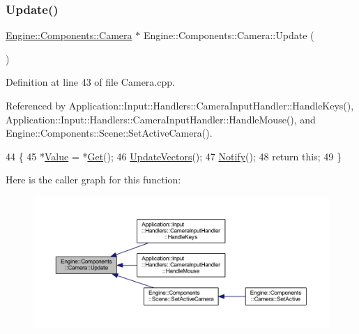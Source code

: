\subsubsection{\texorpdfstring{Update()}{Update()}}
{\footnotesize\ttfamily \mbox{\hyperlink{classEngine_1_1Components_1_1Camera}{Engine\+::\+Components\+::\+Camera}} $\ast$ Engine\+::\+Components\+::\+Camera\+::\+Update (\begin{DoxyParamCaption}{ }\end{DoxyParamCaption})}



Definition at line 43 of file Camera.\+cpp.



Referenced by Application\+::\+Input\+::\+Handlers\+::\+Camera\+Input\+Handler\+::\+Handle\+Keys(), Application\+::\+Input\+::\+Handlers\+::\+Camera\+Input\+Handler\+::\+Handle\+Mouse(), and Engine\+::\+Components\+::\+Scene\+::\+Set\+Active\+Camera().


\begin{DoxyCode}
44 \{
45     *\mbox{\hyperlink{classEngine_1_1Components_1_1Camera_a5d131a78545d9f70496549946503b27a}{Value}} = *\mbox{\hyperlink{classEngine_1_1Components_1_1Camera_ad24b41321813d1757cb6dd0db52e34dd}{Get}}();
46     \mbox{\hyperlink{classEngine_1_1Components_1_1Camera_aa80448fee84ef021ad89c29d10fbaafa}{UpdateVectors}}();
47     \mbox{\hyperlink{classObservable_afaa016d6c6b8a6fad20bb388d35ca014}{Notify}}();
48     \textcolor{keywordflow}{return} \textcolor{keyword}{this};
49 \}
\end{DoxyCode}
Here is the caller graph for this function\+:
\nopagebreak
\begin{figure}[H]
\begin{center}
\leavevmode
\includegraphics[width=350pt]{classEngine_1_1Components_1_1Camera_a364f5e22921e3d234b31297a64c7d932_icgraph}
\end{center}
\end{figure}
\mbox{\label{classEngine_1_1Components_1_1Camera_aa80448fee84ef021ad89c29d10fbaafa}} 
